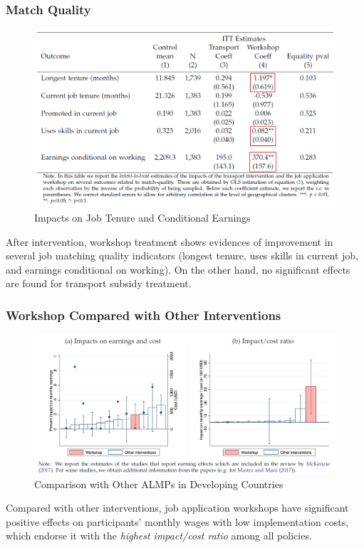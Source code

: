         \subsubsection{Match Quality}
            \begin{figure}[H]
                \centering
                \includegraphics[width=4.5in]{images/ch6/Abebe result 4 matching quality.png}
                \caption{Impacts on Job Tenure and Conditional Earnings}
            \end{figure}
            After intervention, workshop treatment shows evidences of improvement in several job matching quality indicators (longest tenure, uses skills in current job, and earnings conditional on working). On the other hand, no significant effects are found for transport subsidy treatment.
            
        \subsubsection{Workshop Compared with Other Interventions}
            \begin{figure}[H]
                \centering
                \includegraphics[width=5.5in]{images/ch6/Abebe result 5 compare with other policies.png}
                \caption{Comparison with Other ALMPs in Developing Countries}
            \end{figure}
            Compared with other interventions, job application workshops have significant positive effects on participants' monthly wages with low implementation costs, which endorse it with the \emph{highest impact/cost ratio} among all policies.
            
